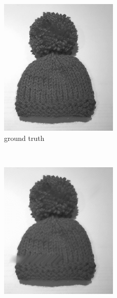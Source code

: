 \documentclass{paper}
\begin{document}
\begin{figure}[ht]
\vspace{3mm}
\begin{subfigure}[h]{0.45\textwidth}
	\centering
	\includegraphics[width=\textwidth]{hat-groundtruth}
	\caption*{ground truth}
\end{subfigure}
~
\begin{subfigure}[h]{0.45\textwidth}
	\centering
	\includegraphics[width=\textwidth]{hat-iter2000-lambda53-alpha0_01}

\end{subfigure}
\end{figure}
\end{document}
